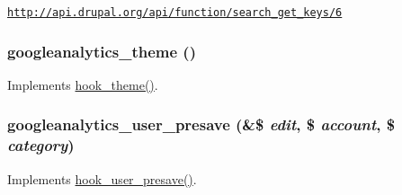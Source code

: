 \href{http://api.drupal.org/api/function/search_get_keys/6}{\tt http://api.drupal.org/api/function/search\_\-get\_\-keys/6} \hypertarget{googleanalytics_8module_a663727599ce5534bc4c145ff1b600b8d}{
\subsubsection[{googleanalytics\_\-theme}]{\setlength{\rightskip}{0pt plus 5cm}googleanalytics\_\-theme ()}}
\label{googleanalytics_8module_a663727599ce5534bc4c145ff1b600b8d}
Implements \hyperlink{group__hooks_ga013ccb45c7aaab1c16cf9691428c910d}{hook\_\-theme()}. \hypertarget{googleanalytics_8module_ac4b9f0ae49deb0cc6be3e2bc164d8412}{
\subsubsection[{googleanalytics\_\-user\_\-presave}]{\setlength{\rightskip}{0pt plus 5cm}googleanalytics\_\-user\_\-presave (\&\$ {\em edit}, \/  \$ {\em account}, \/  \$ {\em category})}}
\label{googleanalytics_8module_ac4b9f0ae49deb0cc6be3e2bc164d8412}
Implements \hyperlink{group__hooks_gab6b224c35d7d97259d4350a7849f1e56}{hook\_\-user\_\-presave()}. 